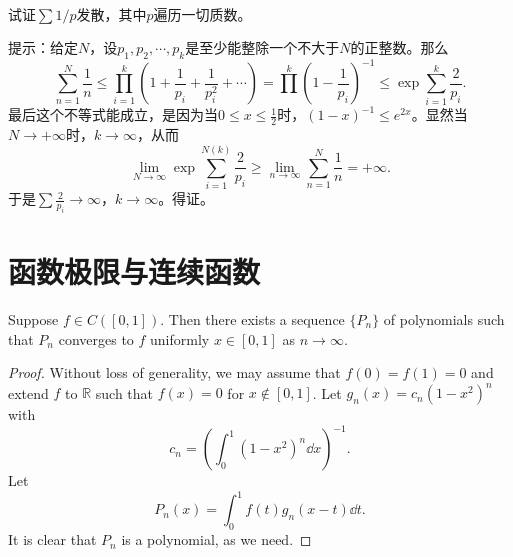 \begin{example}
\hfill\\
试证$\sum1/p$发散，其中$p$遍历一切质数。

提示：给定$N$，设$p_1,p_2,\cdots,p_k$是至少能整除一个不大于$N$的正整数。那么$$\sum_{n=1}^N\frac{1}{n}\leq\prod_{i=1}^k(1+\frac{1}{p_i}+\frac{1}{p_i^2}+\cdots)=\prod^k(1-\frac{1}{p_i})^{-1}\leq\exp\sum_{i=1}^k\frac{2}{p_i}.$$
最后这个不等式能成立，是因为当$0\leq x\leq \frac{1}{2}$时，$(1-x)^{-1}\leq e^{2x}$。显然当$N\rightarrow+\infty$时，$k\to\infty$，从而
$$\lim_{N\to\infty}\exp\sum_{i=1}^{N(k)}\frac{2}{p_i}\geq\lim_{n\to\infty}\sum_{n=1}^N\frac{1}{n}=+\infty.$$
于是$\sum\frac{2}{p_i}\to\infty$，$k\to\infty$。得证。
\end{example}

 \section{函数极限与连续函数}

\begin{theorem}
  Suppose $f\in C([0,1])$. Then there exists a sequence $\{P_n\}$ of polynomials such that 
  $P_n$ converges to $f$ uniformly $x\in[0,1]$ as $n\to\infty$.  
\end{theorem}

\begin{proof}
  Without loss of generality, we may assume that $f(0) = f(1) = 0$ and extend $f$ to $\mathbb{R}$ such that 
  $f(x)=0$ for $x\not\in[0,1]$.
  Let $g_n(x) = c_n(1-x^2)^n$ with 
  \[
  c_n = \left(\int_0^1(1-x^2)^n\dd x\right)^{-1}.
  \]
  Let 
  \[
  P_n(x) = \int_0^1f(t)g_n(x-t)\dd t.
  \]
  It is clear that $P_n$ is a polynomial, as we need.
\end{proof}

